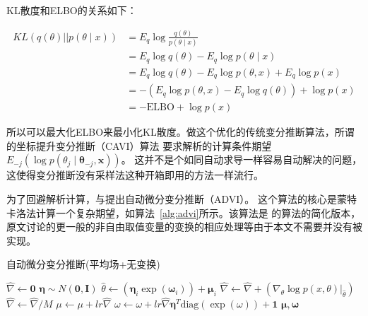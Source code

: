 \documentclass{article}
\begin{document}
KL散度和ELBO的关系如下：

\begin{align*}
KL(q(\theta) || p(\theta \mid x)) &= E_q \log \frac{q(\theta)}{p(\theta \mid x)}  \\
                                  &= E_q \log q(\theta) - E_q \log p(\theta \mid x) \\
                                  &= E_q \log q(\theta) - E_q \log p(\theta,x) + E_q \log p(x) \\
                                  &= -(E_q \log p(\theta,x) -E_q \log q(\theta)) + \log p(x) \\
                                  &= -\mathrm{ELBO} + \log p(x)
\end{align*}


所以可以最大化ELBO来最小化KL散度。做这个优化的传统变分推断算法，所谓的坐标提升变分推断（CAVI）算法
要求解析的计算条件期望$E_{-j}(\log p(\theta_j \mid \mathbf{\theta}_{-j},\mathbf{x}))$。
这并不是个如同自动求导一样容易自动解决的问题，这使得变分推断没有采样法这种开箱即用的方法一样流行。

为了回避解析计算，\cite{kucukelbir2017automatic}与\cite{kucukelbir2014fully}提出自动微分变分推断（ADVI）。
这个算法的核心是蒙特卡洛法计算一个复杂期望，如算法~\ref{alg:advi}所示。该算法是
\cite{kucukelbir2017automatic}的算法的简化版本，
原文讨论的更一般的非自由取值变量的变换的相应处理等由于本文不需要并没有被实现。

\begin{algorithm}
\caption{自动微分变分推断(平均场+无变换)}
\begin{algorithmic}[1]
  
        \State $\hat{\nabla} \gets \mathbf{0}$
        \State $\mathbf{\eta} \sim N(\mathbf{0},\mathbf{I}) $ 
            \State $\hat{\theta} \gets (\mathbf{\eta}_i \exp(\mathbf{\omega}_i)) + \mathbf{\mu}_i$
            \State $\hat{\nabla} \gets \hat{\nabla} + (\nabla_\theta \log p(x,\theta)|_{\hat{\theta}})$
        \EndFor
        \State $\hat{\nabla} \gets \hat{\nabla} / M$
        \State $\mu \gets \mu + lr \hat{\nabla}$
        \State $\omega \gets \omega + lr \hat{\nabla} \mathbf{\eta}^T \mathrm{diag}({\exp(\omega)}) + \mathbf{1}$
    \EndFor 
    \State \Return $\mathbf{\mu},\mathbf{\omega}$
\EndProcedure
\end{algorithmic}
\label{alg:advi}
\end{algorithm}
\end{document}
